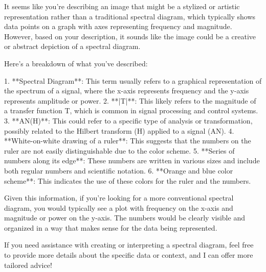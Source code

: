 It seems like you're describing an image that might be a stylized or artistic representation rather than a traditional spectral diagram, which typically shows data points on a graph with axes representing frequency and magnitude. However, based on your description, it sounds like the image could be a creative or abstract depiction of a spectral diagram.

Here's a breakdown of what you've described:

1. **Spectral Diagram**: This term usually refers to a graphical representation of the spectrum of a signal, where the x-axis represents frequency and the y-axis represents amplitude or power.
2. **|T|**: This likely refers to the magnitude of a transfer function T, which is common in signal processing and control systems.
3. **AN(H)**: This could refer to a specific type of analysis or transformation, possibly related to the Hilbert transform (H) applied to a signal (AN).
4. **White-on-white drawing of a ruler**: This suggests that the numbers on the ruler are not easily distinguishable due to the color scheme.
5. **Series of numbers along its edge**: These numbers are written in various sizes and include both regular numbers and scientific notation.
6. **Orange and blue color scheme**: This indicates the use of these colors for the ruler and the numbers.

Given this information, if you're looking for a more conventional spectral diagram, you would typically see a plot with frequency on the x-axis and magnitude or power on the y-axis. The numbers would be clearly visible and organized in a way that makes sense for the data being represented.

If you need assistance with creating or interpreting a spectral diagram, feel free to provide more details about the specific data or context, and I can offer more tailored advice!